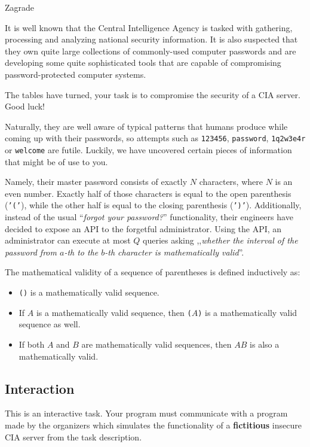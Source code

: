\begin{statement}[
  problempoints=100,
  timelimit=3 seconds,
  memorylimit=512 MiB,
]{Zagrade}

It is well known that the Central Intelligence Agency is tasked with gathering,
processing and analyzing national security information. It is also suspected
that they own quite large collections of commonly-used computer passwords and
are developing some quite sophisticated tools that are capable of compromising
password-protected computer systems.

The tables have turned, your task is to compromise the security of a CIA
server. Good luck!

Naturally, they are well aware of typical patterns that humans produce while
coming up with their passwords, so attempts such as \texttt{123456},
\texttt{password}, \texttt{1q2w3e4r} or \texttt{welcome} are futile. Luckily,
we have uncovered certain pieces of information that might be of use to you.

Namely, their master password consists of exactly $N$ characters, where $N$
is an even number. Exactly half of those characters is equal to the open
parenthesis (\texttt{'('}), while the other half is equal to the closing
parenthesis (\texttt{')'}). Additionally, instead of the usual
``\textit{forgot your password?}'' functionality, their engineers have decided
to expose an API to the forgetful administrator. Using the API, an administrator
can execute at most $Q$ queries asking ,,\textit{whether the interval of
  the password from $a$-th to the $b$-th character is mathematically valid}''.

The mathematical validity of a sequence of parentheses is defined inductively
as:

\begin{itemize}
  \item \texttt{()} is a mathematically valid sequence.
  \item If $A$ is a mathematically valid sequence, then
    \texttt{(}$A$\texttt{)} is a mathematically valid sequence as well.
  \item If both $A$ and $B$ are mathematically valid sequences, then
        $AB$ is also a mathematically valid.
\end{itemize}

\subsection*{Interaction}
This is an interactive task. Your program must communicate with a program made
by the organizers which simulates the functionality of a \textbf{fictitious}
insecure CIA server from the task description.


\end{statement}
